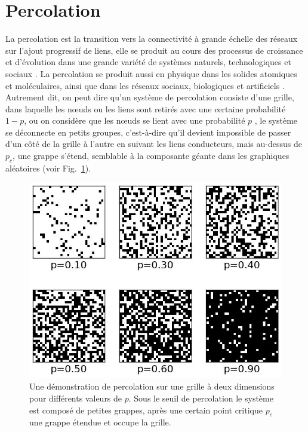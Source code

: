 \section{Percolation}
La percolation est la transition vers la connectivité à grande échelle des réseaux sur l'ajout progressif de liens, elle se produit au cours des processus de croissance et d'évolution dans une grande variété de systèmes naturels, technologiques et sociaux \cite{Strogatz2001,Newman-al2002,Song-al2006,Parshani-al2010,Parshani2-al2010,Ben-Avraham-Havlin2001,Saberi2015}. La percolation se produit aussi en physique dans les solides atomiques et moléculaires, ainsi que dans les réseaux sociaux, biologiques et artificiels \cite{Newman-al2002,Dorogovtsev-al2008,Rozenfeld-al2010}. Autrement dit, on peut dire qu'un système de percolation consiste d'une grille, dans laquelle les nœuds ou les liens sont retirés avec une certaine probabilité $1-p$, ou on considère que les nœuds se lient avec une probabilité $p$ \cite{Bunde-Havlin1996,Stauffer-Aharony1994}, le système se déconnecte en petits groupes, c'est-à-dire qu'il devient impossible de passer d'un côté de la grille à l'autre en suivant les liens conducteurs, mais au-dessus de $p_c$, une grappe s'étend, semblable à la composante géante dans les graphiques aléatoires (voir Fig.~\ref{percolation}).

\begin{figure}[h!]
	\centering
	\includegraphics[scale=0.5]{./figures/percolation}
	\caption{Une démonstration de percolation sur une grille à deux dimensions pour différents valeurs de $p$. Sous le seuil de percolation le système est composé de petites grappes, après une certain point critique $p_c$ une grappe étendue et occupe la grille.}
	\label{percolation}
\end{figure}
